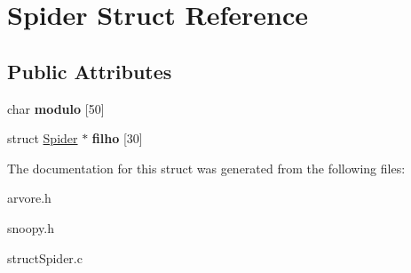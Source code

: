 \hypertarget{struct_spider}{}\section{Spider Struct Reference}
\label{struct_spider}
\subsection*{Public Attributes}
\begin{DoxyCompactItemize}
\item 
\mbox{\label{struct_spider_a2261e9080e52a3281a9f501293542444}} 
char {\bfseries modulo} \mbox{[}50\mbox{]}
\item 
\mbox{\label{struct_spider_a7b4e9fadbc99928b9570e1433b181ccf}} 
struct \mbox{\hyperlink{struct_spider}{Spider}} $\ast$ {\bfseries filho} \mbox{[}30\mbox{]}
\end{DoxyCompactItemize}


The documentation for this struct was generated from the following files\+:\begin{DoxyCompactItemize}
\item 
arvore.\+h\item 
snoopy.\+h\item 
struct\+Spider.\+c\end{DoxyCompactItemize}
